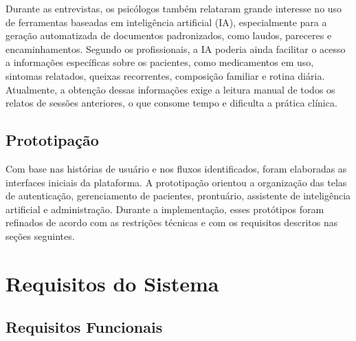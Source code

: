 Durante as entrevistas, os psicólogos também relataram grande interesse no uso de ferramentas baseadas em inteligência artificial (IA), especialmente para a geração automatizada de documentos padronizados, como laudos, pareceres e encaminhamentos. Segundo os profissionais, a IA poderia ainda facilitar o acesso a informações específicas sobre os pacientes, como medicamentos em uso, sintomas relatados, queixas recorrentes, composição familiar e rotina diária. Atualmente, a obtenção dessas informações exige a leitura manual de todos os relatos de sessões anteriores, o que consome tempo e dificulta a prática clínica.

\subsection{Prototipação}

Com base nas histórias de usuário e nos fluxos identificados, foram elaboradas as interfaces iniciais da plataforma. A prototipação orientou a organização das telas de autenticação, gerenciamento de pacientes, prontuário, assistente de inteligência artificial e administração. Durante a implementação, esses protótipos foram refinados de acordo com as restrições técnicas e com os requisitos descritos nas seções seguintes.

\section{Requisitos do Sistema}

\subsection{Requisitos Funcionais}

